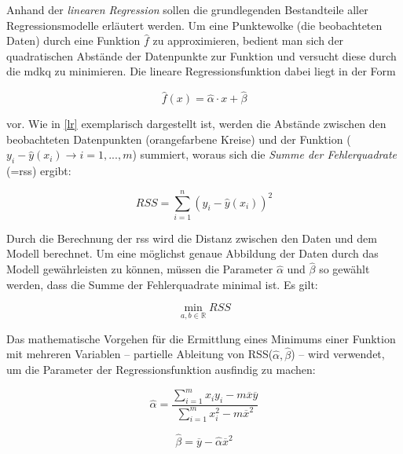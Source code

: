 Anhand der \textit{linearen Regression} sollen die grundlegenden Bestandteile aller Regressionsmodelle erläutert werden. Um eine Punktewolke (die beobachteten Daten) durch eine Funktion $\hat{f}$ zu approximieren, bedient man sich der quadratischen Abstände der Datenpunkte zur Funktion und versucht diese durch die \gls{mdkq} zu minimieren. Die lineare Regressionsfunktion dabei liegt in der Form 

\begin{equation}
	\hat{f}(x) = \hat{\alpha} \cdot x + \hat{\beta}
	\label{lrf}
\end{equation}

vor. Wie in \vref{lr} exemplarisch dargestellt ist, werden die Abstände zwischen den beobachteten Datenpunkten (orangefarbene Kreise) und der Funktion ($y_i -  \hat{y}(x_i) \rightarrow i= 1,...,m$) summiert, woraus sich die \textit{Summe der Fehlerquadrate} (=\gls{rss}) ergibt:

\begin{equation}
	RSS = \sum\limits_{i=1}^n (y_i - \hat{y}(x_i))^2
\end{equation}

Durch die Berechnung der \gls{rss} wird die Distanz zwischen den Daten und dem Modell berechnet. Um eine möglichst genaue Abbildung der Daten durch das Modell gewährleisten zu können, müssen die Parameter $\hat{\alpha}$ und $\hat{\beta}$ so gewählt werden, dass die Summe der Fehlerquadrate minimal ist. Es gilt:

\begin{equation}
	\min\limits_{a,b\in\mathbb{R}} RSS
\end{equation}

Das mathematische Vorgehen für die Ermittlung eines Minimums einer Funktion mit mehreren Variablen -- partielle Ableitung von RSS($\hat{\alpha},\hat{\beta}$) -- wird verwendet, um die Parameter der Regressionsfunktion ausfindig zu machen:

\begin{equation}
	\hat{\alpha} = \frac{\sum\limits_{i=1}^m x_i y_i - m \overline{x} \overline{y}}{\sum\limits_{i=1}^m x^2_i - m \overline{x}^2}
\end{equation}

\begin{equation}
	\hat{\beta} = \overline{y} - \hat{\alpha} \overline{x}^2
\end{equation}

